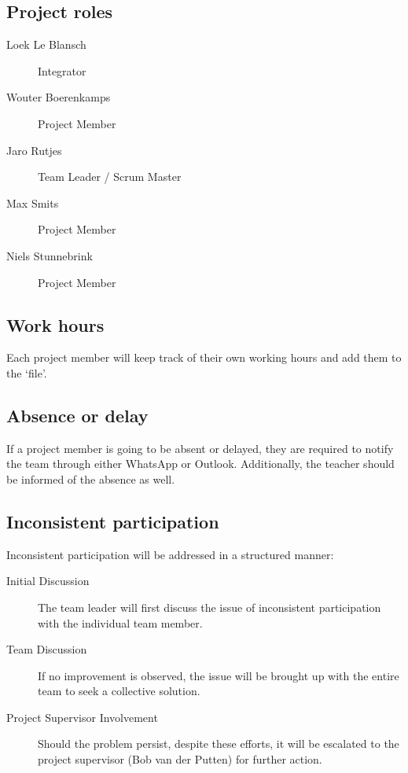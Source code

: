 \documentclass{projdoc}
\begin{document}
\subsection{Project roles}

\begin{description}
	\item[Loek Le Blansch] Integrator
	\item[Wouter Boerenkamps] Project Member
	\item[Jaro Rutjes] Team Leader / Scrum Master
	\item[Max Smits] Project Member
	\item[Niels Stunnebrink] Project Member
\end{description}

\subsection{Work hours}

Each project member will keep track of their own working hours and add them to the
`file'.

\subsection{Absence or delay}

If a project member is going to be absent or delayed, they are required to 
notify the team through either WhatsApp or Outlook. Additionally, the teacher 
should be informed of the absence as well.

\subsection{Inconsistent participation}

Inconsistent participation will be addressed in a structured manner:

\begin{description}
	\item[Initial Discussion] The team leader will first discuss the issue of
		inconsistent participation with the individual team member.
	\item [Team Discussion] If no improvement is observed, the issue will be brought up
		with the entire team to seek a collective solution.
	\item [Project Supervisor Involvement] Should the problem persist, despite these
		efforts, it will be escalated to the project supervisor (Bob van der Putten) for
		further action.
\end{description}
\end{document}
